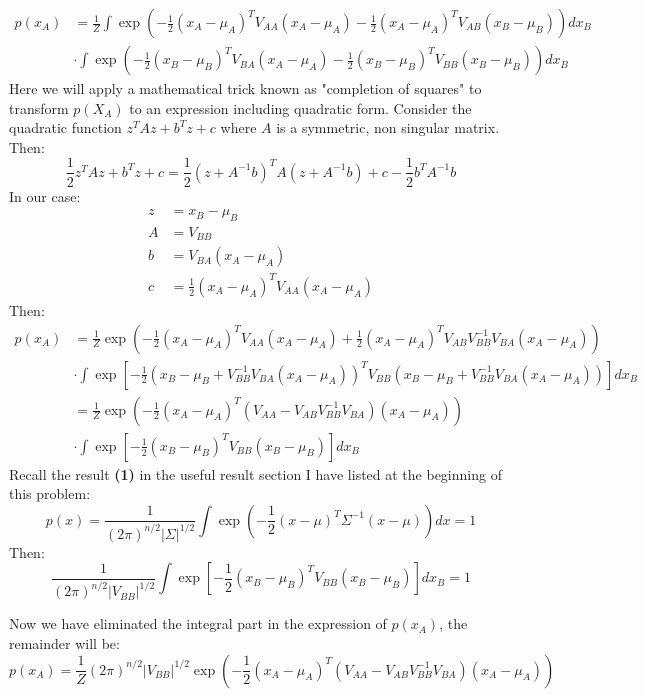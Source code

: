 \documentclass[a4paper, 10pt]{article}  %
\begin{document}
\begin{enumerate}[label=\textbf{(\alph*)}]
    \begin{align*}
        p(x_A) &= \frac{1}{Z} \int \exp \left( -\frac{1}{2}(x_A - \mu_A)^T V_{AA} (x_A - \mu_A) -\frac{1}{2}(x_A - \mu_A)^T V_{AB} (x_B - \mu_B) \right) d x_B \\
        & \cdot \int \exp \left(-\frac{1}{2}(x_B - \mu_B)^T V_{BA} (x_A - \mu_A) -\frac{1}{2}(x_B - \mu_B)^T V_{BB} (x_B - \mu_B) \right) d x_B 
    \end{align*}
    Here we will apply a mathematical trick known as "completion of squares" to transform $p(X_A)$ to an expression including quadratic form. Consider the quadratic function $z^T A z + b^T z + c$ where $A$ is a symmetric, non singular matrix. Then:
    \[\frac{1}{2} z^T A z + b^T z + c = \frac{1}{2} (z + A^{-1}b)^T A (z + A^{-1}b) + c - \frac{1}{2} b^T A^{-1} b\]
    In our case:
    \begin{align*}
        z &= x_B - \mu_B \\
        A &= V_{BB} \\
        b &= V_{BA}(x_A - \mu_A) \\
        c &= \frac{1}{2}(x_A - \mu_A)^T V_{AA} (x_A - \mu_A)
    \end{align*}
    Then:
    \begin{align*}
        p(x_A) &= \frac{1}{Z} \exp \left( -\frac{1}{2}(x_A - \mu_A)^T V_{AA} (x_A - \mu_A) + \frac{1}{2}(x_A - \mu_A)^T V_{AB} V_{BB}^{-1} V_{BA} (x_A - \mu_A)\right) \\
        & \cdot \int \exp \left[ -\frac{1}{2} \left( x_B - \mu_B + V_{BB}^{-1} V_{BA} (x_A - \mu_A) \right)^T V_{BB} \left( x_B - \mu_B + V_{BB}^{-1} V_{BA} (x_A - \mu_A) \right) \right] d x_B \\
        &= \frac{1}{Z} \exp \left( -\frac{1}{2}(x_A - \mu_A)^T (V_{AA} - V_{AB} V_{BB}^{-1} V_{BA}) (x_A - \mu_A)\right) \\
        & \cdot \int \exp \left[ -\frac{1}{2} \left( x_B - \mu_B\right)^T V_{BB} \left( x_B - \mu_B \right) \right] d x_B
    \end{align*}
    Recall the result \textbf{(1)} in the useful result section I have listed at the beginning of this problem:
    \[p(x) = \frac{1}{(2 \pi)^{n/2} |\Sigma|^{1/2}} 
        \int \exp \left( -\frac{1}{2} (x - \mu)^T \Sigma^{-1} (x - \mu)\right) d x = 1 \]
    Then:
    \[\frac{1}{(2 \pi)^{n/2} |V_{BB}|^{1/2}} \int \exp \left[ -\frac{1}{2} \left( x_B - \mu_B\right)^T V_{BB} \left( x_B - \mu_B \right) \right] d x_B = 1\]
    
    Now we have eliminated the integral part in the expression of $p(x_A)$, the remainder will be:
    \[p(x_A) = \frac{1}{Z} (2 \pi)^{n/2} |V_{BB}|^{1/2} \exp \left( -\frac{1}{2}(x_A - \mu_A)^T (V_{AA} - V_{AB} V_{BB}^{-1} V_{BA}) (x_A - \mu_A)\right)\]
    

\end{enumerate}
\end{document}
